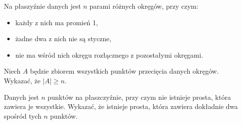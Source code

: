 



\noindent
Na płaszyźnie danych jest $n$ parami różnych okręgów, przy czym:
\begin{itemize}
	\item każdy z nich ma promień 1,
	\item żadne dwa z nich nie są styczne,
	\item nie ma wśród nich okręgu rozłącznego z pozostałymi okręgami.
\end{itemize}

\noindent
Niech $A$ będzie zbiorem wszystkich punktów przecięcia danych okręgów. Wykazać, że $|A| \geqslant n$.




\noindent
Danych jest $n$ punktów na płaszczyźnie, przy czym nie istnieje prosta, która zawiera je wszystkie. Wykazać, że istnieje prosta, która zawiera dokładnie dwa spośród tych $n$ punktów.

